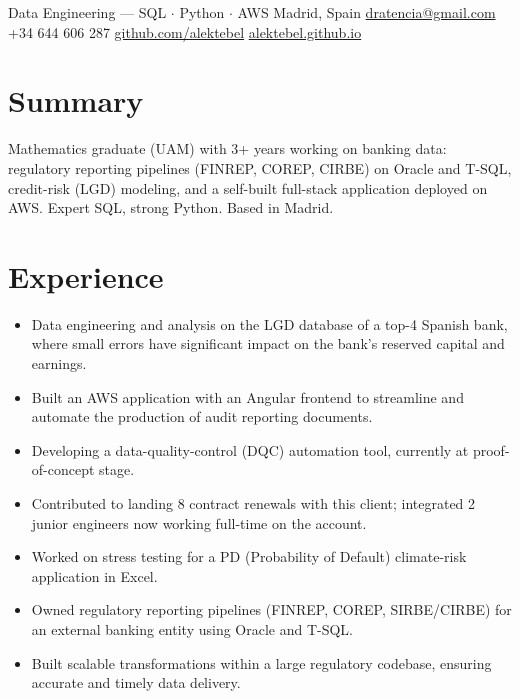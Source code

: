 \documentclass[10pt,a4paper]{article}
\begin{document}
  {Data Engineering --- SQL \(\cdot\) Python \(\cdot\) AWS}
  {Madrid, Spain \;\textbullet\; \href{mailto:dratencia@gmail.com}{dratencia@gmail.com} \;\textbullet\; +34 644 606 287}
  {\href{https://github.com/alektebel}{github.com/alektebel} \;\textbullet\; \href{https://alektebel.github.io}{alektebel.github.io}}

\section{Summary}
Mathematics graduate (UAM) with 3+ years working on banking data: regulatory
reporting pipelines (FINREP, COREP, CIRBE) on Oracle and T-SQL, credit-risk
(LGD) modeling, and a self-built full-stack application deployed on AWS.
Expert SQL, strong Python. Based in Madrid.

\section{Experience}

\begin{itemize}
  \item Data engineering and analysis on the LGD database of a top-4 Spanish bank, where small errors have significant impact on the bank's reserved capital and earnings.
  \item Built an AWS application with an Angular frontend to streamline and automate the production of audit reporting documents.
  \item Developing a data-quality-control (DQC) automation tool, currently at proof-of-concept stage.
  \item Contributed to landing 8 contract renewals with this client; integrated 2 junior engineers now working full-time on the account.
\end{itemize}

\vspace{4pt}
\begin{itemize}
  \item Worked on stress testing for a PD (Probability of Default) climate-risk application in Excel.
\end{itemize}

\vspace{4pt}
\begin{itemize}
  \item Owned regulatory reporting pipelines (FINREP, COREP, SIRBE/CIRBE) for an external banking entity using Oracle and T-SQL.
  \item Built scalable transformations within a large regulatory codebase, ensuring accurate and timely data delivery.
\end{itemize}
\end{document}
